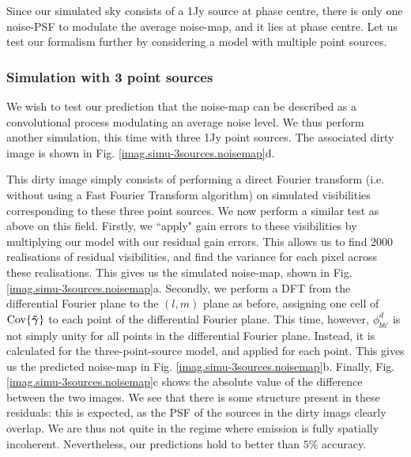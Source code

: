 \pg
{Since our simulated sky consists of a 1Jy source at phase centre, there is only one noise-PSF to modulate the average noise-map, and it lies at phase centre. Let us test our formalism further by considering a model with multiple point sources.}

\subsubsection{Simulation with 3 point sources}

\pg
{We wish to test our prediction that the noise-map can be described as a convolutional process modulating an average noise level. We thus perform another simulation, this time with three 1Jy point sources. The associated dirty image is shown in Fig. \ref{imag.simu-3sources.noisemap}d. }



\pg
{This dirty image simply consists of performing a direct Fourier transform (i.e. without using a Fast Fourier Transform algorithm) on simulated visibilities corresponding to these three point sources. We now perform a similar test as above on this field. Firstly, we ``apply" gain errors to these visibilities by multiplying our model with our residual gain errors. This allows us to find 2000 realisations of residual visibilities, and find the variance for each pixel across these realisations. This gives us the simulated noise-map, shown in Fig. \ref{imag.simu-3sources.noisemap}a. Secondly, we perform a DFT from the differential Fourier plane to the $(l,m)$ plane as before, assigning one cell of $\textrm{Cov}\{\bm{\tilde{\gamma}}\}$ to each point of the differential Fourier plane. This time, however, $\phi_{bb'}^d$ is not simply unity for all points in the differential Fourier plane. Instead, it is calculated for the three-point-source model, and applied for each point. This gives us the predicted noise-map in Fig. \ref{imag.simu-3sources.noisemap}b. Finally, Fig. \ref{imag.simu-3sources.noisemap}c shows the absolute value of the difference between the two images. We see that there is some structure present in these residuals: this is expected, as the PSF of the sources in the dirty imags clearly overlap. We are thus not quite in the regime where emission is fully spatially incoherent. Nevertheless, our predictions hold to better than $5\%$ accuracy. }

